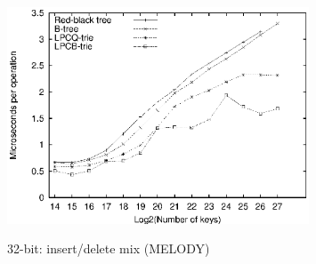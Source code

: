 \documentclass[]{acmtrans2m}
\begin{document}
{\begin{figure}
\center
\includegraphics[width=0.8\textwidth]{plots/melody_drandom_time.eps}\\
\caption{32-bit: insert/delete mix (MELODY)}
\end{figure}

}
\end{document}
